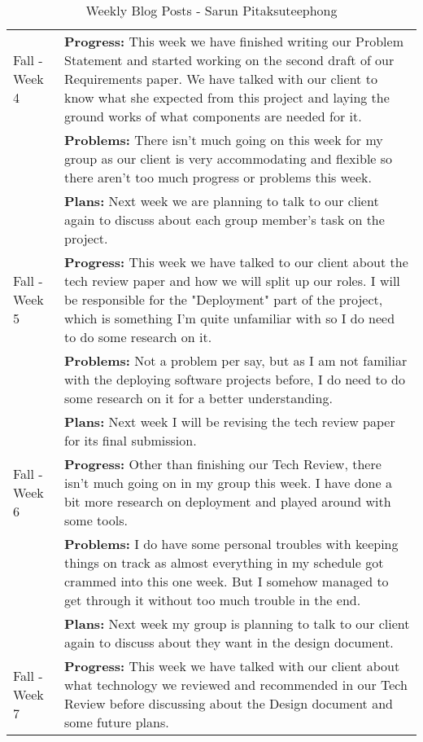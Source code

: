 \begin{longtable}[ht]{| p{1.5cm} | p{13.5cm} |}
    \caption{Weekly Blog Posts - Sarun Pitaksuteephong}
     \\\hline
     Fall - Week 4 &
     \textbf{Progress:}
     This week we have finished writing our Problem Statement and started working on the second draft of our Requirements paper. 
     We have talked with our client to know what she expected from this project and laying the ground works of what components are needed for it.
     \\ & \textbf{Problems:}
     There isn't much going on this week for my group as our client is very accommodating and flexible so there aren't too much progress or problems this week.
     \\ & \textbf{Plans:}
     Next week we are planning to talk to our client again to discuss about each group member's task on the project. 
     \\
     \hline
     Fall - Week 5 &
     \textbf{Progress:}
     This week we have talked to our client about the tech review paper and how we will split up our roles. 
     I will be responsible for the "Deployment" part of the project, which is something I'm quite unfamiliar with so I do need to do some research on it.
     \\ & \textbf{Problems:}
     Not a problem per say, but as I am not familiar with the deploying software projects before, I do need to do some research on it for a better understanding.
     \\ & \textbf{Plans:}
     Next week I will be revising the tech review paper for its final submission.
     \\
     \hline
     Fall - Week 6 &
     \textbf{Progress:}
     Other than finishing our Tech Review, there isn't much going on in my group this week. 
     I have done a bit more research on deployment and played around with some tools.
     \\ & \textbf{Problems:}
     I do have some personal troubles with keeping things on track as almost everything in my schedule got crammed into this one week. 
     But I somehow managed to get through it without too much trouble in the end.
     \\ & \textbf{Plans:}
     Next week my group is planning to talk to our client again to discuss about they want in the design document.
     \\
     \hline
     Fall - Week 7 &
     \textbf{Progress:}
     This week we have talked with our client about what technology we reviewed and recommended in our Tech Review before discussing about the Design document and some future plans. 

\end{longtable}
